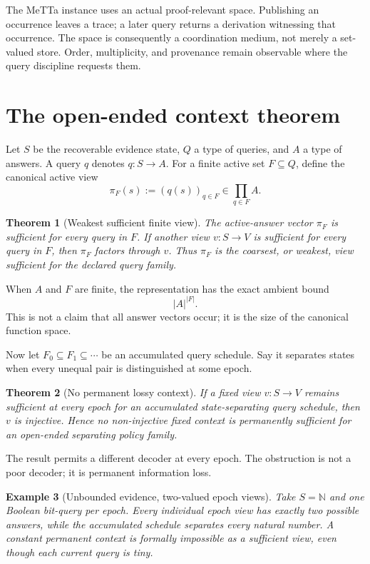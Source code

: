 \documentclass[11pt]{article}
\newtheorem{theorem}{Theorem}[section]
\newtheorem{example}[theorem]{Example}
\begin{document}
The MeTTa instance uses an actual proof-relevant space.  Publishing an occurrence
leaves a trace; a later query returns a derivation witnessing that occurrence.  The
space is consequently a coordination medium, not merely a set-valued store.  Order,
multiplicity, and provenance remain observable where the query discipline requests
them.

\section{The open-ended context theorem}

Let $S$ be the recoverable evidence state, $Q$ a type of queries, and $A$ a type of
answers.  A query $q$ denotes $q:S\to A$.  For a finite active set $F\subseteq Q$,
define the canonical active view
\[
  \pi_F(s) := (q(s))_{q\in F} \in \prod_{q\in F} A.
\]

\begin{theorem}[Weakest sufficient finite view]
The active-answer vector $\pi_F$ is sufficient for every query in $F$.  If another
view $v:S\to V$ is sufficient for every query in $F$, then $\pi_F$ factors through
$v$.  Thus $\pi_F$ is the coarsest, or weakest, view sufficient for the declared
query family.
\end{theorem}

When $A$ and $F$ are finite, the representation has the exact ambient bound
\[
  |A|^{|F|}.
\]
This is not a claim that all answer vectors occur; it is the size of the canonical
function space.

Now let $F_0\subseteq F_1\subseteq\cdots$ be an accumulated query schedule.  Say it
separates states when every unequal pair is distinguished at some epoch.

\begin{theorem}[No permanent lossy context]
If a fixed view $v:S\to V$ remains sufficient at every epoch for an accumulated
state-separating query schedule, then $v$ is injective.  Hence no non-injective fixed
context is permanently sufficient for an open-ended separating policy family.
\end{theorem}

The result permits a different decoder at every epoch.  The obstruction is not a
poor decoder; it is permanent information loss.

\begin{example}[Unbounded evidence, two-valued epoch views]
Take $S=\mathbb{N}$ and one Boolean bit-query per epoch.  Every individual epoch view
has exactly two possible answers, while the accumulated schedule separates every
natural number.  A constant permanent context is formally impossible as a sufficient
view, even though each current query is tiny.
\end{example}
\end{document}
